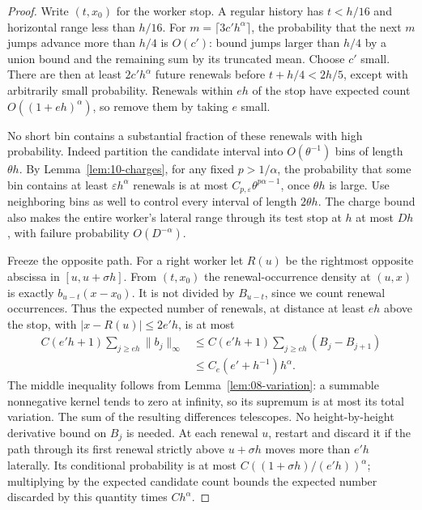 \begin{proof}
Write \((t,x_0)\) for the worker stop. A regular history has
\(t<h/16\) and horizontal range less than \(h/16\). For
\(m=\lceil3c'h^\alpha\rceil\), the probability that the next \(m\)
jumps advance more than \(h/4\) is \(O(c')\): bound jumps larger than
\(h/4\) by a union bound and the remaining sum by its truncated mean.
Choose \(c'\) small. There are then at least \(2c'h^\alpha\) future
renewals before \(t+h/4<2h/5\), except with arbitrarily small
probability. Renewals within \(eh\) of the stop have expected count
\(O((1+eh)^\alpha)\), so remove them by taking \(e\) small.

No short bin contains a substantial fraction of these renewals with
high probability. Indeed partition the candidate interval into
\(O(\theta^{-1})\) bins of length \(\theta h\). By
Lemma~\ref{lem:10-charges}, for any fixed \(p>1/\alpha\), the probability
that some bin contains at least \(\varepsilon h^\alpha\) renewals is at
most \(C_{p,\varepsilon}\theta^{p\alpha-1}\), once \(\theta h\) is
large. Use neighboring bins as well to control every interval of length
\(2\theta h\). The charge bound also makes the entire worker's lateral
range through its test stop at \(h\) at most \(Dh\), with failure
probability \(O(D^{-\alpha})\).

Freeze the opposite path. For a right worker let \(R(u)\) be the
rightmost opposite abscissa in \([u,u+\sigma h]\). From \((t,x_0)\)
the renewal-occurrence density at \((u,x)\) is exactly
\(b_{u-t}(x-x_0)\). It is not divided by \(B_{u-t}\), since we count
renewal occurrences. Thus the expected number of renewals, at distance
at least \(eh\) above the stop, with \(|x-R(u)|\le2e'h\), is at most
\begin{align*}
 C(e'h+1)\sum_{j\ge eh}\|b_j\|_\infty
 &\le C(e'h+1)\sum_{j\ge eh}(B_j-B_{j+1})\\
 &\le C_e(e'+h^{-1})h^\alpha.
\end{align*}
The middle inequality follows from Lemma~\ref{lem:08-variation}: a summable nonnegative kernel tends to zero at infinity, so its supremum is at most its total variation. The sum of the resulting differences telescopes. No height-by-height derivative bound on $B_j$ is needed.
At each renewal \(u\), restart and discard it if the path through its
first renewal strictly above \(u+\sigma h\) moves more than \(e'h\)
laterally. Its conditional probability is at most
\(C((1+\sigma h)/(e'h))^\alpha\); multiplying by the expected candidate
count bounds the expected number discarded by this quantity times
\(Ch^\alpha\).


\end{proof}
